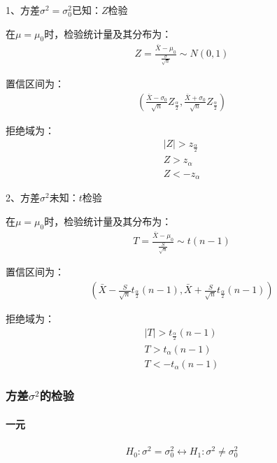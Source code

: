 \documentclass[12pt]{book}
\begin{document}
1、方差$\sigma^2 = \sigma^2_0$已知：$Z$检验

在$\mu = \mu_0$时，检验统计量及其分布为：
\begin{gather*}
    Z=\frac{\bar{X}-\mu_0}{\frac{\sigma}{\sqrt{n}}}\sim N(0,1)
\end{gather*}


置信区间为：
\begin{gather*}
    \left(\frac{\bar{X}-\sigma_0}{\sqrt{n}}Z_{\frac{\alpha}{2}}, \frac{\bar{X}+\sigma_0}{\sqrt{n}}Z_{\frac{\alpha}{2}} \right)
\end{gather*}


拒绝域为：
\begin{gather*}
    \left|Z\right|>z_{\frac{\alpha}{2}} \\
    Z >  z_\alpha\\
    Z < -z_\alpha
\end{gather*}


2、方差$\sigma^2$未知：$t$检验

在$\mu = \mu_0$时，检验统计量及其分布为：
\begin{gather*}
    T=\frac{\bar{X}-\mu_0}{\frac{S}{\sqrt{n}}}\sim t(n-1)
\end{gather*}


置信区间为：
\begin{gather*}
    \left( \bar{X}-\frac{S}{\sqrt{n}}t_{\frac{\alpha}{2}}(n-1), \bar{X}+\frac{S}{\sqrt{n}}t_{\frac{\alpha}{2}}(n-1) \right)
\end{gather*}


拒绝域为：
\begin{gather*}
    \left|T\right|>t_{\frac{\alpha}{2}}\left(n-1\right) \\
    T>t_\alpha\left(n-1\right) \\
    T<-t_\alpha\left(n-1\right)
\end{gather*}


\subsubsection{方差$\sigma^2$的检验}

\paragraph{一元}


\begin{gather*}
    H_0: \sigma^2=\sigma_0^2 \leftrightarrow H_1: \sigma^2\neq\sigma_0^2 \\
\end{gather*}
\end{document}
